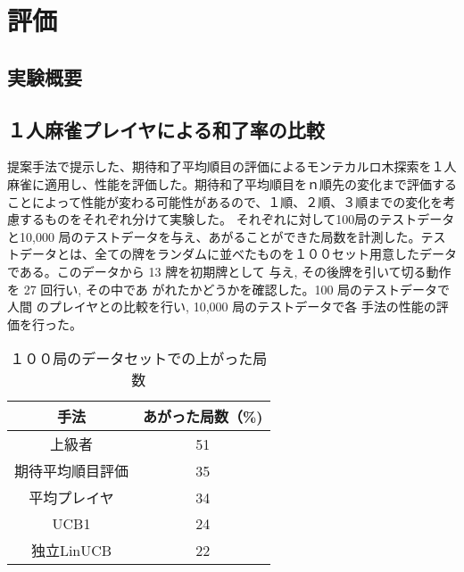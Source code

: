 \chapter{評価}
\label{chap:evaluation}
\section{実験概要}
\section{１人麻雀プレイヤによる和了率の比較}
提案手法で提示した、期待和了平均順目の評価によるモンテカルロ木探索を１人麻雀に適用し、性能を評価した。期待和了平均順目をｎ順先の変化まで評価することによって性能が変わる可能性があるので、１順、２順、３順までの変化を考慮するものをそれぞれ分けて実験した。
それぞれに対して100局のテストデータと10,000 局のテストデータを与え、あがることができた局数を計測した。テストデータとは、全ての牌をランダムに並べたものを１００セット用意したデータである。このデータから 13 牌を初期牌として 与え, その後牌を引いて切る動作を 27 回行い, その中であ がれたかどうかを確認した。100 局のテストデータで人間 のプレイヤとの比較を行い, 10,000 局のテストデータで各 手法の性能の評価を行った。


\begin{table}[htbp]
  \caption{１００局のデータセットでの上がった局数}
  \label{tb:dataset}
  \begin{center}
  \begin{tabular}{c|c}
    \hline
    手法   & あがった局数（\%)\\\hline\hline
    上級者 	& 51 \\\hline
    期待平均順目評価 & 35 \\\hline
    平均プレイヤ 	& 34 \\\hline
    UCB1 	& 24\\\hline
    独立LinUCB 	& 22 \\\hline
  \end{tabular}\end{center}
\end{table}




